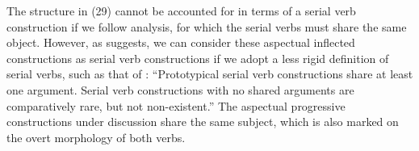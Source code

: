 \documentclass[output=paper]{langsci/langscibook}
\begin{document}
\ea%
\label{ex:lorusso:38}
    \z
\z    

The structure in (29) cannot be accounted for in terms of a serial verb construction if we follow  analysis, for which the serial verbs must share the same object. However, as \citet{Cruschina2013} suggests, we can consider these aspectual inflected constructions as serial verb constructions if we adopt a less rigid definition of serial verbs, such as that of \citet[12]{Aikhenvald2006}: “Prototypical serial verb constructions share at least one argument. Serial verb constructions with no shared arguments are comparatively rare, but not non-existent.” The aspectual progressive constructions under discussion share the same subject, which is also marked on the overt morphology of both verbs. 
\end{document}
